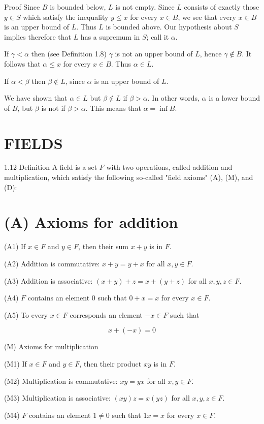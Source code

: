 \documentclass[10pt]{article}
\begin{document}
Proof Since $B$ is bounded below, $L$ is not empty. Since $L$ consists of exactly those $y \in S$ which satisfy the inequality $y \leq x$ for every $x \in B$, we see that every $x \in B$ is an upper bound of $L$. Thus $L$ is bounded above. Our hypothesis about $S$ implies therefore that $L$ has a supremum in $S$; call it $\alpha$.

If $\gamma<\alpha$ then (see Definition 1.8) $\gamma$ is not an upper bound of $L$, hence $\gamma \notin B$. It follows that $\alpha \leq x$ for every $x \in B$. Thus $\alpha \in L$.

If $\alpha<\beta$ then $\beta \notin L$, since $\alpha$ is an upper bound of $L$.

We have shown that $\alpha \in L$ but $\beta \notin L$ if $\beta>\alpha$. In other words, $\alpha$ is a lower bound of $B$, but $\beta$ is not if $\beta>\alpha$. This means that $\alpha=\inf B$.

\section{FIELDS}
1.12 Definition A field is a set $F$ with two operations, called addition and multiplication, which satisfy the following so-called "field axioms" (A), (M), and (D):

\section{(A) Axioms for addition}
(A1) If $x \in F$ and $y \in F$, then their sum $x+y$ is in $F$.

(A2) Addition is commutative: $x+y=y+x$ for all $x, y \in F$.

(A3) Addition is associative: $(x+y)+z=x+(y+z)$ for all $x, y, z \in F$.

(A4) $F$ contains an element 0 such that $0+x=x$ for every $x \in F$.

(A5) To every $x \in F$ corresponds an element $-x \in F$ such that

$$
x+(-x)=0
$$

(M) Axioms for multiplication

(M1) If $x \in F$ and $y \in F$, then their product $x y$ is in $F$.

(M2) Multiplication is commutative: $x y=y x$ for all $x, y \in F$.

(M3) Multiplication is associative: $(x y) z=x(y z)$ for all $x, y, z \in F$.

(M4) $F$ contains an element $1 \neq 0$ such that $1 x=x$ for every $x \in F$.
\end{document}
